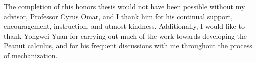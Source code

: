 \documentclass[acmsmall]{acmart}\settopmatter{printccs=false,printacmref=false}
\begin{document}







\begin{acks}
The completion of this honors thesis would not have been possible without my advisor, Professor Cyrus Omar, and I thank him for his continual support, encouragement, instruction, and utmost kindness. Additionally, I would like to thank Yongwei Yuan for carrying out much of the work towards developing the Peanut calculus, and for his frequent discussions with me throughout the process of mechanization.
\end{acks}
\newpage

\end{document}
